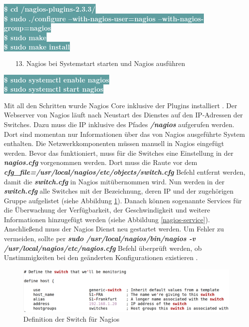 \documentclass[fontsize=12pt,paper=a4,open=any,parskip=half,
  twoside=false,toc=listof,toc=bibliography,fleqn,leqno,
  captions=nooneline,captions=tableabove,british]{scrbook}
\begin{document}
\colorbox{CadetBlue}{\textcolor{white}{\textbf{\textsf{\$ cd /nagios-plugins-2.3.3/}}}}\\
\colorbox{CadetBlue}{\textcolor{white}{\textbf{\textsf{\$ sudo ./configure --with-nagios-user=nagios --with-nagios-group=nagios}}}}\\
\colorbox{CadetBlue}{\textcolor{white}{\textbf{\textsf{\$ sudo make}}}}\\
\colorbox{CadetBlue}{\textcolor{white}{\textbf{\textsf{\$ sudo make install}}}}
\newpage
\begin{itemize}
\item[13.] Nagios bei Systemstart starten und Nagios ausführen
\end{itemize}
\colorbox{CadetBlue}{\textcolor{white}{\textbf{\textsf{\$ sudo systemctl enable nagios}}}}\\
\colorbox{CadetBlue}{\textcolor{white}{\textbf{\textsf{\$ sudo systemctl start nagios}}}}


Mit all den Schritten wurde Nagios Core inklusive der Plugins installiert \cite{nagiosinstall}. Der Webserver von Nagios läuft nach Neustart des Dienstes auf den IP-Adressen der Switches. Dazu muss die IP inklusive des Pfades \textit{\textbf{/nagios}} aufgerufen werden. Dort sind momentan nur Informationen über das von Nagios ausgeführte System enthalten. Die Netzwerkkomponenten müssen manuell in Nagios eingefügt werden. Bevor das funktioniert, muss für die Switches eine Einstellung in der \textit{\textbf{nagios.cfg}} vorgenommen werden. Dort muss die Raute vor dem \textit{\textbf{cfg\_file=/usr/local/nagios/etc/objects/switch.cfg}} Befehl entfernt werden, damit die \textit{\textbf{switch.cfg}} in Nagios mitübernommen wird. Nun werden in der \textit{\textbf{switch.cfg}} alle Switches mit der Bezeichnung, deren IP und der zugehörigen Gruppe aufgelistet (siehe Abbildung \ref{nagios-switch}). Danach können sogenannte Services für die Überwachung der Verfügbarkeit, der Geschwindigkeit und weitere Informationen hinzugefügt werden (siehe Abbildung \ref{nagios-service}). Anschließend muss der Nagios Dienst neu gestartet werden. Um Fehler zu vermeiden, sollte per \textit{\textbf{sudo /usr/local/nagios/bin/nagios -v /usr/local/nagios/etc/nagios.cfg}} Befehl überprüft werden, ob Unstimmigkeiten bei den geänderten Konfigurationen existieren \cite{nagiosrouter}.\par

\begin{figure}[H]
 \centering
 \includegraphics[width=1.0\textwidth]{Bilder/nagios-switch}
 \captionsetup{justification=centering, margin=2cm}
 \caption{Definition der Switch für Nagios}
 \label{nagios-switch}
\end{figure}
\end{document}
